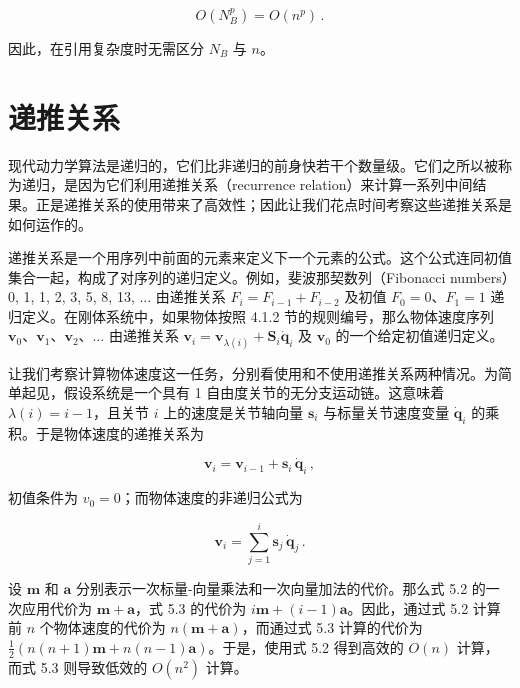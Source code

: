 \documentclass[10pt,a4paper]{book}
\theoremstyle{thmstyle} %
\theoremstyle{defstyle} %
\theoremstyle{prostyle} %
\begin{document}
$$
O ( N _ { B } ^{p} ) = O ( n ^{p} ) \, .
$$



因此，在引用复杂度时无需区分 $N_{B}$ 与 $n$。



\section{递推关系}





现代动力学算法是递归的，它们比非递归的前身快若干个数量级。它们之所以被称为递归，是因为它们利用递推关系（recurrence relation）来计算一系列中间结果。正是递推关系的使用带来了高效性；因此让我们花点时间考察这些递推关系是如何运作的。



递推关系是一个用序列中前面的元素来定义下一个元素的公式。这个公式连同初值集合一起，构成了对序列的递归定义。例如，斐波那契数列（Fibonacci numbers）0, 1, 1, 2, 3, 5, 8, 13, ... 由递推关系 $F_i = F_{i-1} + F_{i-2}$ 及初值 $F_0 = 0$、$F_1 = 1$ 递归定义。在刚体系统中，如果物体按照 4.1.2 节的规则编号，那么物体速度序列 $\boldsymbol{v}_0$、$\boldsymbol{v}_1$、$\boldsymbol{v}_2$、... 由递推关系 $\boldsymbol{v}_i = \boldsymbol{v}_{\lambda(i)} + \boldsymbol{S}_i \dot{\boldsymbol{q}}_i$ 及 $\boldsymbol{v}_0$ 的一个给定初值递归定义。



让我们考察计算物体速度这一任务，分别看使用和不使用递推关系两种情况。为简单起见，假设系统是一个具有 1 自由度关节的无分支运动链。这意味着 $\lambda(i)=i-1$，且关节 $i$ 上的速度是关节轴向量 $\boldsymbol{s}_i$ 与标量关节速度变量 $\dot{\boldsymbol{q}}_i$ 的乘积。于是物体速度的递推关系为



$$
\boldsymbol { v } _ { i } = \boldsymbol { v } _ { i - 1 } + \boldsymbol { s } _ { i } \, \dot { \boldsymbol { q } } _ { i } \, ,
$$



初值条件为 $v_{0} = 0$；而物体速度的非递归公式为



$$
{ \boldsymbol { v } } _ { i } = \sum _ { j = 1 } ^{i} { \boldsymbol { s } } _ { j } \, { \dot { \boldsymbol { q } } } _ { j } \, .
$$



设 $\mathbf{m}$ 和 $\mathbf{a}$ 分别表示一次标量-向量乘法和一次向量加法的代价。那么式 5.2 的一次应用代价为 $\mathbf{m} + \mathbf{a}$，式 5.3 的代价为 $i\mathbf{m} + (i - 1)\mathbf{a}$。因此，通过式 5.2 计算前 $n$ 个物体速度的代价为 $n(\mathbf{m} + \mathbf{a})$，而通过式 5.3 计算的代价为 $\frac{1}{2}(n(n + 1)\mathbf{m} + n(n - 1)\mathbf{a})$。于是，使用式 5.2 得到高效的 $O(n)$ 计算，而式 5.3 则导致低效的 $O(n^2)$ 计算。
\end{document}
